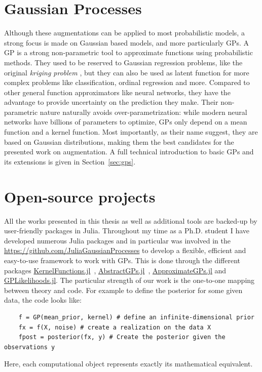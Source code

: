 \section{Gaussian Processes}

Although these augmentations can be applied to most probabilistic models, a strong focus is made on Gaussian based models, and more particularly \acf{GPs}.
A \ac{GP} is a strong non-parametric tool to approximate functions using probabilistic methods.
They used to be reserved to Gaussian regression problems, like the original \textit{kriging problem} \cite{cressie1990origins}, but they can also be used as latent function for more complex problems like classification, ordinal regression and more.
Compared to other general function approximators like neural networks, they have the advantage to provide uncertainty on the prediction they make.
Their non-parametric nature naturally avoids over-parametrization: while modern neural networks have billions of parameters to optimize, \ac{GPs} only depend on a mean function and a kernel function.
Most importantly, as their name suggest, they are based on Gaussian distributions, making them the best candidates for the presented work on augmentation.
A full technical introduction to basic \ac{GPs} and its extensions is given in Section~\ref{sec:gps}.

\section{Open-source projects}

All the works presented in this thesis as well as additional tools are backed-up by user-friendly packages in Julia.
Throughout my time as a Ph.D. student I have developed numerous Julia packages and in particular was involved in the \href{JuliaGaussianProcesses organisation}{https://github.com/JuliaGaussianProcesses} to develop a flexible, efficient and easy-to-use framework to work with \ac{GPs}.
This is done through the different packages \href{https://github.com/JuliaGaussianProcesses/KernelFunctions.jl}{KernelFunctions.jl}~\cite{theo_galy_fajou_2022_6246597}, \href{https://github.com/JuliaGaussianProcesses/AbstractGPs.jl}{AbstractGPs.jl}~\cite{david_widmann_2022_5939997}, \href{https://github.com/JuliaGaussianProcesses/ApproximateGPs.jl}{ApproximateGPs.jl} and \href{https://github.com/JuliaGaussianProcesses/GPLikelihoods.jl}{GPLikelihoods.jl}.
The particular strength of our work is the one-to-one mapping between theory and code.
For example to define the posterior for some given data, the code looks like:
\begin{verbatim}
    f = GP(mean_prior, kernel) # define an infinite-dimensional prior
    fx = f(X, noise) # create a realization on the data X
    fpost = posterior(fx, y) # Create the posterior given the observations y
\end{verbatim}
Here, each computational object represents exactly its mathematical equivalent.

